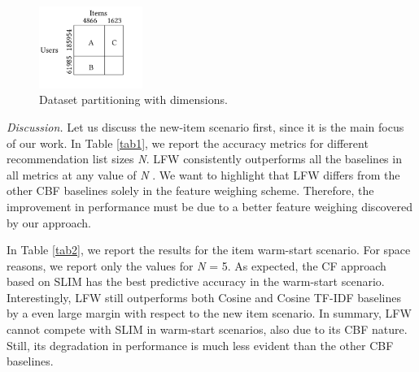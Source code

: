 \documentclass{sig-alternate}
\begin{document}
\begin{figure}[ht]
  \caption{Dataset partitioning with dimensions.}
  \label{f1}
  \centering
    \includegraphics[width=0.3\textwidth]{figure}
\end{figure}
\textit{Discussion.} Let us discuss the new-item scenario first, since it
is the main focus of our work. In Table \ref{tab1}, we report the accuracy
metrics for different recommendation list sizes \textit{N}. LFW consistently
outperforms all the baselines in all metrics at any value of \textit{N} . We
want to highlight that LFW differs from the other CBF baselines
solely in the feature weighing scheme. Therefore, the improvement
in performance must be due to a better feature weighing discovered
by our approach.

In Table \ref{tab2}, we report the results for the item warm-start scenario.
For space reasons, we report only the values for \textit{N} = 5. As expected,
the CF approach based on SLIM has the best predictive accuracy
in the warm-start scenario. Interestingly, LFW still outperforms
both Cosine and Cosine TF-IDF baselines by a even large margin
with respect to the new item scenario. In summary, LFW cannot
compete with SLIM in warm-start scenarios, also due to its CBF
nature. Still, its degradation in performance is much less evident
than the other CBF baselines.
\end{document}

